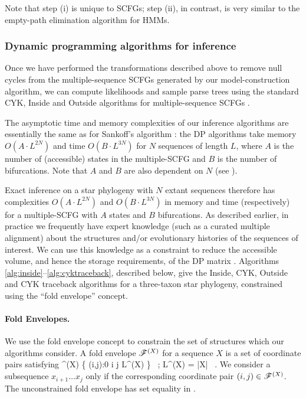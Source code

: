 \documentclass[10pt]{article}
\begin{document}
Note that step (i) is unique to SCFGs; step (ii), in contrast, is very similar to the empty-path elimination algorithm for HMMs.




\subsubsection*{Dynamic programming algorithms for inference}

Once we have performed the transformations described above to remove
null cycles from the multiple-sequence SCFGs generated by our
model-construction algorithm, we can compute likelihoods and sample parse trees
using the standard CYK, Inside and Outside algorithms for multiple-sequence SCFGs \cite{Sankoff85,Durbin98}.

The asymptotic time and memory complexities of our inference algorithms
are essentially the same as for Sankoff's algorithm \cite{Sankoff85}:
the DP algorithms take memory $O(A \cdot L^{2N})$ and time $O(B \cdot L^{3N})$
for $N$ sequences of length $L$, where $A$ is the number of
(accessible) states in the multiple-SCFG and $B$ is the number of
bifurcations.
Note that $A$ and $B$ are also dependent on $N$ (see ).

Exact inference on a star phylogeny with $N$ extant sequences therefore
has complexities $O(A \cdot L^{2N})$ and $O(B \cdot L^{3N})$ in memory and
time (respectively) for a multiple-SCFG with $A$ states and $B$ bifurcations. As
described earlier, in practice we frequently have expert knowledge
(such as a curated multiple alignment)
about the structures and/or evolutionary histories of the sequences of
interest.  We can use this knowledge as a constraint to reduce the accessible volume, and hence the storage requirements, of the DP matrix \cite{Holmes2005}.
Algorithms \ref{alg:inside}--\ref{alg:cyktraceback}, described below, give the Inside, CYK,
Outside and CYK traceback algorithms for a three-taxon star phylogeny,
constrained using the ``fold envelope'' concept.

\paragraph{Fold Envelopes.}
We use the fold envelope concept \cite{HolmesRubin2002a,Holmes2004}
to constrain the set of structures which our algorithms consider.
A fold envelope $\mathscr{F}^{(X)}$ for a sequence $X$ is a set of coordinate pairs satisfying
\beqn {}
\foldenv^{(X)} \subseteq \left\{ (i,j):0 \le i \le j \le L^{(X)} \right\} \, ;
\quad L^{(X)} = |X| \, .
\eeqn
We consider a subsequence $x_{i+1} \dots x_{j}$ only if the corresponding coordinate pair $(i,j) \in \mathscr{F}^{(X)}$.
The unconstrained fold envelope has set equality in .
\end{document}
